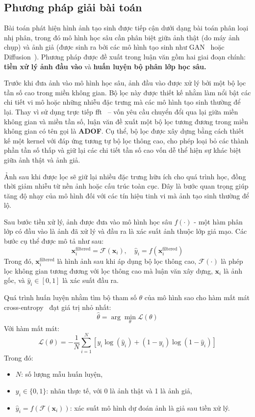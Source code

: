 \subsection{Phương pháp giải bài toán}

Bài toán phát hiện hình ảnh tạo sinh được tiếp cận dưới dạng bài toán phân loại nhị phân, trong đó mô hình học sâu cần phân biệt giữa ảnh thật (do máy ảnh chụp) và ảnh giả (được sinh ra bởi các mô hình tạo sinh như GAN~\cite{Goodfellow2014GenerativeAN} hoặc Diffusion~\cite{Ho2020DenoisingDP}). Phương pháp được đề xuất trong luận văn gồm hai giai đoạn chính: \textbf{tiền xử lý ảnh đầu vào} và \textbf{huấn luyện bộ phân lớp học sâu.}

Trước khi đưa ảnh vào mô hình học sâu, ảnh đầu vào được xử lý bởi một bộ lọc tần số cao trong miền không gian. Bộ lọc này được thiết kế nhằm làm nổi bật các chi tiết vi mô hoặc những nhiễu đặc trưng mà các mô hình tạo sinh thường để lại. Thay vì sử dụng trực tiếp \gls{fft}~\cite{Arunachalam2013TheFF} – vốn yêu cầu chuyển đổi qua lại giữa miền không gian và miền tần số, luận văn đề xuất một bộ lọc tương đương trong miền không gian có tên gọi là \textbf{ADOF}. Cụ thể, bộ lọc được xây dựng bằng cách thiết kế một \gls{kernel} với đáp ứng tương tự bộ lọc thông cao, cho phép loại bỏ các thành phần tần số thấp và giữ lại các chi tiết tần số cao vốn dễ thể hiện sự khác biệt giữa ảnh thật và ảnh giả.

Ảnh sau khi được lọc sẽ giữ lại nhiều đặc trưng hữu ích cho quá trình học, đồng thời giảm nhiễu từ nền ảnh hoặc cấu trúc toàn cục. Đây là bước quan trọng giúp tăng độ nhạy của mô hình đối với các tín hiệu tinh vi mà ảnh tạo sinh thường để lộ.

Sau bước tiền xử lý, ảnh được đưa vào mô hình học sâu \( f(\cdot) \) - một hàm phân lớp có đầu vào là ảnh đã xử lý và đầu ra là xác suất ảnh thuộc lớp giả mạo. Các bước cụ thể được mô tả như sau:
\[
\mathbf{x}_i^{\text{filtered}} = \mathcal{F}(\mathbf{x}_i), \quad \hat{y}_i = f(\mathbf{x}_i^{\text{filtered}})
\]
Trong đó,
\(\mathbf{x}_i^{\text{filtered}}\) là hình ảnh sau khi áp dụng bộ lọc thông cao,
\( \mathcal{F}(\cdot) \) là phép lọc không gian tương đương với lọc thông cao mà luận văn xây dựng,
\( \mathbf{x}_i \) là ảnh gốc, và \( \hat{y}_i \in [0,1] \) là xác suất đầu ra.

Quá trình huấn luyện nhằm tìm bộ tham số \( \theta \) của mô hình sao cho hàm mất mát cross-entropy~\cite{2023arXiv230407288M} đạt giá trị nhỏ nhất:
\[
\hat{\theta} = \arg \min_{\theta} \mathcal{L}(\theta)
\]
Với hàm mất mát:
\[
\mathcal{L}(\theta) = -\frac{1}{N} \sum_{i=1}^{N} \left[ y_i \log(\hat{y}_i) + (1 - y_i) \log(1 - \hat{y}_i) \right]
\]
Trong đó:
\begin{itemize}
	\item \( N \): số lượng mẫu huấn luyện,
	\item \( y_i \in \{0, 1\} \): nhãn thực tế, với 0 là ảnh thật và 1 là ảnh giả,
	\item \( \hat{y}_i = f(\mathcal{F}(\mathbf{x}_i)) \): xác suất mô hình dự đoán ảnh là giả sau tiền xử lý.
\end{itemize}

